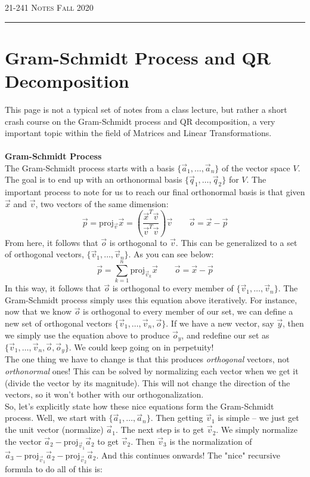 \documentclass[12pt]{amsart}
\begin{document}
\thispagestyle{empty}

{\scshape 21-241} \hfill {\scshape \Large Notes} \hfill {\scshape Fall 2020}
\medskip
\hrule
\bigskip

\section*{Gram-Schmidt Process and QR Decomposition}
This page is not a typical set of notes from a class lecture, but rather a short crash course on the Gram-Schmidt process and QR decomposition, a very important topic within the field of Matrices and Linear Transformations.\\ \\
\textbf{Gram-Schmidt Process}\\
The Gram-Schmidt process starts with a basis $\{\vec{a}_1, \dots, \vec{a}_n\}$ of the vector space $V$. The goal is to end up with an orthonormal basis $\{\vec{q}_1, \dots, \vec{q}_2\}$ for $V$. The important process to note for us to reach our final orthonormal basis is that given $\vec{x}$ and $\vec{v}$, two vectors of the same dimension:
\[\vec{p} = \mathrm{proj}_{\vec{v}}\vec{x} = \left(\frac{\vec{x}^T\vec{v}}{\vec{v}^T\vec{v}}\right)\vec{v} \quad \quad \vec{o} = \vec{x} - \vec{p}\]
From here, it follows that $\vec{o}$ is orthogonal to $\vec{v}$. This can be generalized to a set of orthogonal vectors, $\{\vec{v}_1, \dots, \vec{v}_n \}$. As you can see below:
\[\vec{p} = \sum_{k = 1}^n\mathrm{proj}_{\vec{v}_k}\vec{x} \quad \quad \vec{o} = \vec{x} - \vec{p}\]
In this way, it follows that $\vec{o}$ is orthogonal to every member of $\{\vec{v}_1, \dots, \vec{v}_n \}$. The Gram-Schmidt process simply uses this equation above iteratively. For instance, now that we know $\vec{o}$ is orthogonal to every member of our set, we can define a new set of orthogonal vectors $\{\vec{v}_1, \dots, \vec{v}_n, \vec{o}\}$. If we have a new vector, say $\vec{y}$, then we simply use the equation above to produce $\vec{o}_y$, and redefine our set as $\{\vec{v}_1, \dots, \vec{v}_n, \vec{o}, \vec{o}_y\}$. We could keep going on in perpetuity!\\
The one thing we have to change is that this produces \textit{orthogonal} vectors, not \textit{orthonormal} ones! This can be solved by normalizing each vector when we get it (divide the vector by its magnitude). This will not change the direction of the vectors, so it won't bother with our orthogonalization.\\
So, let's explicitly state how these nice equations form the Gram-Schmidt process. Well, we start with $\{\vec{a}_1, \dots, \vec{a}_n\}$. Then getting $\vec{v}_1$ is simple -- we just get the unit vector (normalize) $\vec{a}_1$. The next step is to get $\vec{v}_2$. We simply normalize the vector $\vec{a}_2 - \mathrm{proj}_{\vec{v}_1}\vec{a}_2$ to get $\vec{v}_2$. Then $\vec{v}_3$ is the normalization of $\vec{a}_3 - \mathrm{proj}_{\vec{v}_1}\vec{a}_2 - \mathrm{proj}_{\vec{v}_2}\vec{a}_2$. And this continues onwards! The "nice" recursive formula to do all of this is:
\end{document}
